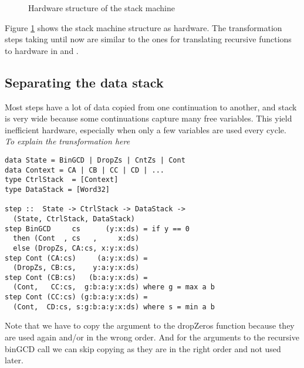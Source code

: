 \documentclass[preprint]{sigplanconf}
\begin{document}
\begin{figure}
\centering
{}
\caption{Hardware structure of the stack machine}
\label{fig:stack}
\end{figure}
Figure \ref{fig:stack} shows the stack machine structure as hardware.
The transformation steps taking until now are similar to the ones for translating recursive functions to hardware in \cite{Ingmar} and \cite{Zhai}.


\subsection{Separating the data stack}
Most steps have a lot of data copied from one continuation to another, and stack is very wide because some continuations capture many free variables.
This yield inefficient hardware, especially when only a few variables are used every cycle. \\

\textit{To explain the transformation here}

\begin{lstlisting}
data State = BinGCD | DropZs | CntZs | Cont
data Context = CA | CB | CC | CD | ...
type CtrlStack  = [Context]
type DataStack = [Word32]

step ::  State -> CtrlStack -> DataStack ->
  (State, CtrlStack, DataStack)
step BinGCD     cs      (y:x:ds) = if y == 0
  then (Cont  , cs   ,     x:ds)
  else (DropZs, CA:cs, x:y:x:ds)
step Cont (CA:cs)     (a:y:x:ds) = 
  (DropZs, CB:cs,    y:a:y:x:ds)
step Cont (CB:cs)   (b:a:y:x:ds) = 
  (Cont,   CC:cs,  g:b:a:y:x:ds) where g = max a b
step Cont (CC:cs) (g:b:a:y:x:ds) = 
  (Cont,  CD:cs, s:g:b:a:y:x:ds) where s = min a b
\end{lstlisting}
Note that we have to copy the argument to the dropZeros function because they are used again and/or in the wrong order.
And for the arguments to the recursive binGCD call we can skip copying as they are in the right order and not used later.
\end{document}
